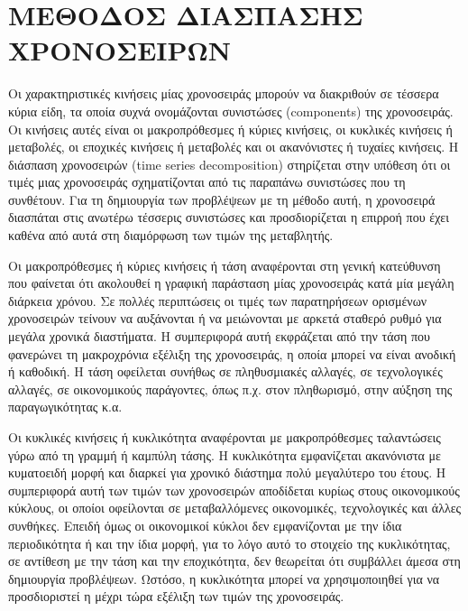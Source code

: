\section{ΜΕΘΟΔΟΣ ΔΙΑΣΠΑΣΗΣ ΧΡΟΝΟΣΕΙΡΩΝ}
Οι χαρακτηριστικές κινήσεις μίας χρονοσειράς μπορούν να διακριθούν σε
τέσσερα κύρια είδη, τα οποία συχνά ονομάζονται συνιστώσες (components) της
χρονοσειράς. Οι κινήσεις αυτές είναι οι μακροπρόθεσμες ή κύριες κινήσεις, οι κυκλικές κινήσεις ή μεταβολές, οι εποχικές κινήσεις ή μεταβολές και οι ακανόνιστες
ή τυχαίες κινήσεις. Η διάσπαση χρονοσειρών (time series decomposition) στηρίζεται
στην υπόθεση ότι οι τιμές μιας χρονοσειράς σχηματίζονται από τις παραπάνω
συνιστώσες που τη συνθέτουν. Για τη δημιουργία των προβλέψεων με τη μέθοδο
αυτή, η χρονοσειρά διασπάται στις ανωτέρω τέσσερις συνιστώσες και προσδιορίζεται
η επιρροή που έχει καθένα από αυτά στη διαμόρφωση των τιμών της μεταβλητής.

Οι μακροπρόθεσμες ή κύριες κινήσεις ή τάση αναφέρονται στη γενική
κατεύθυνση που φαίνεται ότι ακολουθεί η γραφική παράσταση μίας χρονοσειράς
κατά μία μεγάλη διάρκεια χρόνου. Σε πολλές περιπτώσεις οι τιμές των
παρατηρήσεων ορισμένων χρονοσειρών τείνουν να αυξάνονται ή να μειώνονται με
αρκετά σταθερό ρυθμό για μεγάλα χρονικά διαστήματα. Η συμπεριφορά αυτή
εκφράζεται από την τάση που φανερώνει τη μακροχρόνια εξέλιξη της χρονοσειράς, η
οποία μπορεί να είναι ανοδική ή καθοδική. Η τάση οφείλεται συνήθως σε
πληθυσμιακές αλλαγές, σε τεχνολογικές αλλαγές, σε οικονομικούς παράγοντες, όπως
π.χ. στον πληθωρισμό, στην αύξηση της παραγωγικότητας κ.α.

Οι κυκλικές κινήσεις ή κυκλικότητα αναφέρονται με μακροπρόθεσμες
ταλαντώσεις γύρω από τη γραμμή ή καμπύλη τάσης. Η κυκλικότητα εμφανίζεται
ακανόνιστα με κυματοειδή μορφή και διαρκεί για χρονικό διάστημα πολύ μεγαλύτερο
του έτους. Η συμπεριφορά αυτή των τιμών των χρονοσειρών αποδίδεται κυρίως
στους οικονομικούς κύκλους, οι οποίοι οφείλονται σε μεταβαλλόμενες οικονομικές,
τεχνολογικές και άλλες συνθήκες. Επειδή όμως οι οικονομικοί κύκλοι δεν
εμφανίζονται με την ίδια περιοδικότητα ή και την ίδια μορφή, για το λόγο αυτό το
στοιχείο της κυκλικότητας, σε αντίθεση με την τάση και την εποχικότητα, δεν
θεωρείται ότι συμβάλλει άμεσα στη δημιουργία προβλέψεων. Ωστόσο, η κυκλικότητα
μπορεί να χρησιμοποιηθεί για να προσδιοριστεί η μέχρι τώρα εξέλιξη των τιμών της
χρονοσειράς.

